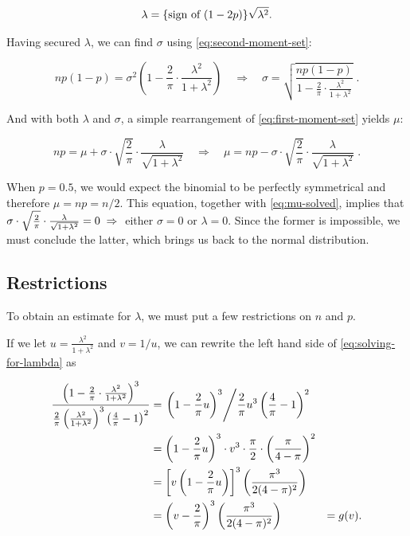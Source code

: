 \documentclass{article}
\begin{document}
\begin{equation}
  \label{eq:lambda-solved}
  \lambda = \textnormal{\{sign of $(1-2p)$\}} \sqrt{\lambda^2}.
\end{equation}

Having secured $\lambda$, we can find $\sigma$ using
\eqref{eq:second-moment-set}:

\begin{equation}
  \label{eq:sigma-solved}
  np(1-p) = \sigma^2 \left( 1 - \frac{2}{\pi} \cdot \frac{\lambda^2}{1 + \lambda^2} \right) \quad\Rightarrow\quad
  \sigma = \sqrt{\frac{np(1-p)}{1 - \frac{2}{\pi} \cdot \frac{\lambda^2}{1 + \lambda^2}}} \;.
\end{equation}

And with both $\lambda$ and $\sigma$, a simple rearrangement of
\eqref{eq:first-moment-set} yields $\mu$:

\begin{equation}
  \label{eq:mu-solved}
  np = \mu + \sigma \cdot \sqrt{\frac{2}{\pi}} \cdot \frac{\lambda}{\sqrt{1 + \lambda^2}} \quad\Rightarrow\quad
  \mu = np - \sigma \cdot \sqrt{\frac{2}{\pi}} \cdot \frac{\lambda}{\sqrt{1 + \lambda^2}} \;.
\end{equation}

When $p = 0.5$, we would expect the binomial to be perfectly symmetrical and
therefore $\mu = np = n/2$. This equation, together with \eqref{eq:mu-solved},
implies that $\sigma \cdot \sqrt{\frac{2}{\pi}} \cdot \frac{\lambda}{\sqrt{1 +
\lambda^2}} = 0 \;\Rightarrow\;$ either $\sigma = 0$ or $\lambda = 0$. Since the former is
impossible, we must conclude the latter, which brings us back to the normal
distribution.

\subsection{Restrictions}

To obtain an estimate for $\lambda$, we must put a few restrictions on $n$ and
$p$.

If we let $u = \frac{\lambda^2}{1+\lambda^2}$ and $v = 1/u$, we can rewrite the
left hand side of \eqref{eq:solving-for-lambda} as

\begin{alignat}{3}
  \frac{\left( 1 - \frac{2}{\pi} \cdot \frac{\lambda^2}{1+\lambda^2} \right)^3}{\frac{2}{\pi} \left( \frac{\lambda^2}{1+\lambda^2} \right)^3 \left( \frac{4}{\pi} - 1 \right)^2}
    &= \left. \left( 1 - \frac{2}{\pi} u \right)^3 \middle/ \frac{2}{\pi} u^3 \left( \frac{4}{\pi} - 1 \right)^2 \right. & \nonumber \\
  &= \left( 1 - \frac{2}{\pi} u \right)^3 \cdot v^3 \cdot \frac{\pi}{2} \cdot \left( \frac{\pi}{4-\pi} \right)^2 & \nonumber \\
  &= \left[ v \left( 1 - \frac{2}{\pi} u \right) \right]^3 \left( \frac{\pi^3}{2(4-\pi)^2} \right) & \nonumber \\
  &= \left( v - \frac{2}{\pi} \right)^3 \left( \frac{\pi^3}{2(4-\pi)^2} \right) &= g(v). \label{eq:lhs-solving-for-lambda}
\end{alignat}
\end{document}
